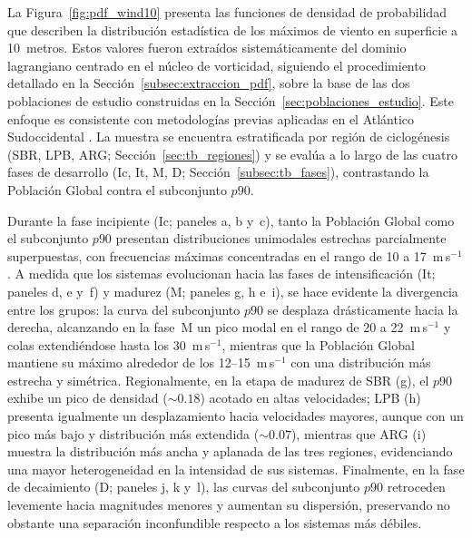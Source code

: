 La Figura~\ref{fig:pdf_wind10} presenta las funciones de densidad de probabilidad que describen la distribución estadística de los máximos de viento en superficie a 10~metros. Estos valores fueron extraídos sistemáticamente del dominio lagrangiano centrado en el núcleo de vorticidad, siguiendo el procedimiento detallado en la Sección~\ref{subsec:extraccion_pdf}, sobre la base de las dos poblaciones de estudio construidas en la Sección~\ref{sec:poblaciones_estudio}. Este enfoque es consistente con metodologías previas aplicadas en el Atlántico Sudoccidental \citep{cardoso2022synoptic}. La muestra se encuentra estratificada por región de ciclogénesis (SBR, LPB, ARG; Sección~\ref{sec:tb_regiones}) y se evalúa a lo largo de las cuatro fases de desarrollo (Ic, It, M, D; Sección~\ref{subsec:tb_fases}), contrastando la Población Global contra el subconjunto $p90$.

Durante la fase incipiente (Ic; paneles a, b y~c), tanto la Población Global como el subconjunto $p90$ presentan distribuciones unimodales estrechas parcialmente superpuestas, con frecuencias máximas concentradas en el rango de 10 a 17~m\,s$^{-1}$. A medida que los sistemas evolucionan hacia las fases de intensificación (It; paneles d, e y~f) y madurez (M; paneles g, h e~i), se hace evidente la divergencia entre los grupos: la curva del subconjunto $p90$ se desplaza drásticamente hacia la derecha, alcanzando en la fase~M un pico modal en el rango de 20 a 22~m\,s$^{-1}$ y colas extendiéndose hasta los 30~m\,s$^{-1}$, mientras que la Población Global mantiene su máximo alrededor de los 12--15~m\,s$^{-1}$ con una distribución más estrecha y simétrica. Regionalmente, en la etapa de madurez de SBR (g), el $p90$ exhibe un pico de densidad (${\sim}0.18$) acotado en altas velocidades; LPB (h) presenta igualmente un desplazamiento hacia velocidades mayores, aunque con un pico más bajo y distribución más extendida (${\sim}0.07$), mientras que ARG (i) muestra la distribución más ancha y aplanada de las tres regiones, evidenciando una mayor heterogeneidad en la intensidad de sus sistemas. Finalmente, en la fase de decaimiento (D; paneles j, k y~l), las curvas del subconjunto $p90$ retroceden levemente hacia magnitudes menores y aumentan su dispersión, preservando no obstante una separación inconfundible respecto a los sistemas más débiles.

